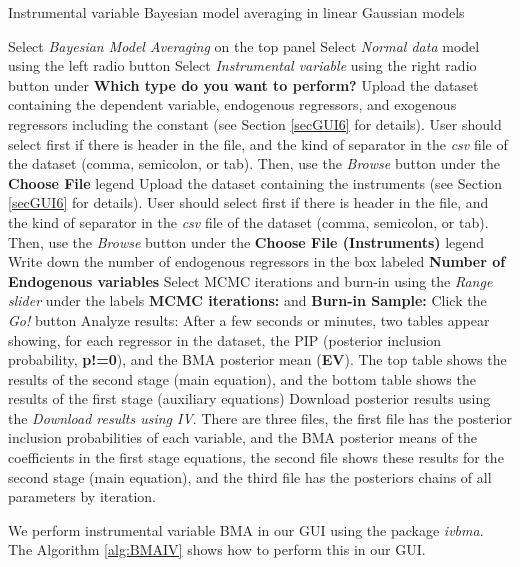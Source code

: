 \begin{algorithm}[h!]
	\caption{Instrumental variable Bayesian model averaging in linear Gaussian models}\label{alg:BMAIV}
	\begin{algorithmic}[1]  		 			
		\State Select \textit{Bayesian Model Averaging} on the top panel
		\State Select \textit{Normal data} model using the left radio button
		\State Select \textit{Instrumental variable} using the right radio button under \textbf{Which type do you want to perform?}
		\State Upload the dataset containing the dependent variable, endogenous regressors, and exogenous regressors including the constant (see Section \ref{secGUI6} for details).  User should select first if there is header in the file, and the kind of separator in the \textit{csv} file of the dataset (comma, semicolon, or tab). Then, use the \textit{Browse} button under the \textbf{Choose File} legend
		\State Upload the dataset containing the instruments (see Section \ref{secGUI6} for details).  User should select first if there is header in the file, and the kind of separator in the \textit{csv} file of the dataset (comma, semicolon, or tab). Then, use the \textit{Browse} button under the \textbf{Choose File (Instruments)} legend
		\State Write down the number of endogenous regressors in the box labeled \textbf{Number of Endogenous variables}
		\State Select MCMC iterations and burn-in using the \textit{Range slider} under the labels \textbf{MCMC iterations:} and \textbf{Burn-in Sample:}
		\State Click the \textit{Go!} button
		\State Analyze results: After a few seconds or minutes, two tables appear showing, for each regressor in the dataset, the PIP (posterior inclusion probability, \textbf{p!=0}), and the BMA posterior mean (\textbf{EV}). The top table shows the results of the second stage (main equation), and the bottom table shows the results of the first stage (auxiliary equations)
		\State Download posterior results using the \textit{Download results using IV}. There are three files, the first file has the posterior inclusion probabilities of each variable, and the BMA posterior means of the coefficients in the first stage equations, the second file shows these results for the second stage (main equation), and the third file has the posteriors chains of all parameters by iteration. 
	\end{algorithmic} 
\end{algorithm}

We perform instrumental variable BMA in our GUI using the package \textit{ivbma}. The Algorithm \ref{alg:BMAIV} shows how to perform this in our GUI. 

